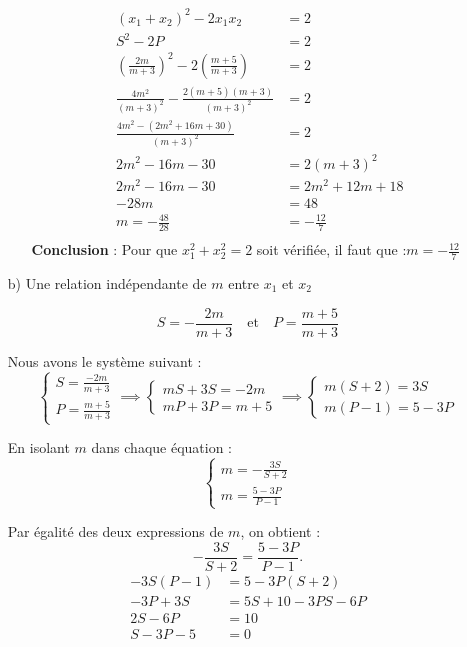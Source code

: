 \documentclass[12pt,a4paper]{article}
\begin{document}
\begin{enumerate}
\begin{itemize}
\begin{align*}
\left( x_1 + x_2 \right)^2 - 2x_1x_2 &= 2\\
S^2 - 2P &= 2\\
\left( \frac{2m}{m+3} \right)^2 - 2 \left( \frac{m+5}{m+3} \right) &= 2\\
\frac{4m^2}{(m+3)^2} - \frac{2(m+5)(m+3)}{(m+3)^2} &= 2\\
\frac{4m^2 - \left( 2m^2 + 16m + 30 \right)}{(m+3)^2} &= 2\\
2m^2 - 16m - 30 &= 2(m+3)^2\\
2m^2 - 16m - 30 &= 2m^2 + 12m + 18\\
-28m &= 48\\
m = -\frac{48}{28} &= -\frac{12}{7}\\
\end{align*}
\textbf{Conclusion} :  
Pour que \( x_1^{2} + x_2^{2} = 2 \) soit vérifiée, il faut que :\( m = -\frac{12}{7} \)
\end{itemize}

\item[b)] Une relation indépendante de $m$ entre $x_1$ et $x_2$

\[
S = -\frac{2m}{m+3} \quad \text{et} \quad P = \frac{m+5}{m+3}
\]

Nous avons le système suivant :
\[
\begin{cases}
S=\frac{-2m}{m+3} \\
P=\frac{m+5}{m+3}
\end{cases} \implies 
\begin{cases}
mS + 3S = -2m \\
mP + 3P = m+5
\end{cases}\implies
\begin{cases}
m(S + 2) = 3S \\
m(P - 1) = 5 - 3P
\end{cases}
\]

En isolant $m$ dans chaque équation :
\[
\begin{cases}
m = -\frac{3S}{S + 2} \\
m = \frac{5 - 3P}{P - 1}
\end{cases}
\]

Par égalité des deux expressions de $m$, on obtient :
\[
-\frac{3S}{S + 2} = \frac{5 - 3P}{P - 1}.
\]
\[
\begin{aligned}
  -3S(P-1) &= 5 - 3P(S+2) \\
  -3P + 3S &= 5S + 10 - 3PS - 6P \\
  2S - 6P &= 10 \\
  S - 3P -5&= 0
\end{aligned}
\]
\begin{center}
\textcolor{green}{}
\end{center}
\end{enumerate}
\end{document}
